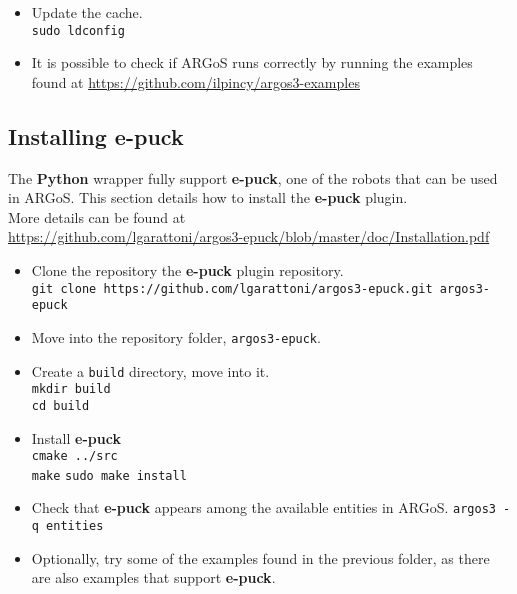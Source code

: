 \documentclass[
12pt,
a4paper,
oneside,
headinclude,
footinclude]{article}
\theoremstyle{definition} %
\begin{document}
\begin{itemize}
    \item Update the cache.\\
    \-\quad\texttt{sudo ldconfig}
    
    \item It is possible to check if ARGoS runs correctly by running the examples found at \href{https://github.com/ilpincy/argos3-examples}{https://github.com/ilpincy/argos3-examples}    
\end{itemize}

\newpage

\subsection{Installing e-puck}
The \textbf{Python} wrapper fully support \textbf{e-puck}, one of the robots that can be used in ARGoS.
This section details how to install the \textbf{e-puck} plugin.\\
More details can be found at\\ \href{https://github.com/lgarattoni/argos3-epuck/blob/master/doc/Installation.pdf}{https://github.com/lgarattoni/argos3-epuck/blob/master/doc/Installation.pdf}

\begin{itemize}
    \item Clone the repository the \textbf{e-puck} plugin repository.\\
    \-\quad\texttt{git clone https://github.com/lgarattoni/argos3-epuck.git argos3-epuck}
    
    \item Move into the repository folder, \texttt{argos3-epuck}.
    
    \item Create a \texttt{build} directory, move into it.\\
    \-\quad\texttt{mkdir build}\\
    \-\quad\texttt{cd build}
    
    \item Install \textbf{e-puck}\\
    \-\quad\texttt{cmake ../src}\\
    \-\quad\texttt{make}
    \-\quad\texttt{sudo make install}
    
    \item Check that \textbf{e-puck} appears among the available entities in ARGoS.
    \-\quad\texttt{argos3 -q entities} 
    
    \item Optionally, try some of the examples found in the previous folder, as there are also examples that support \textbf{e-puck}.       
\end{itemize}
\end{document}
